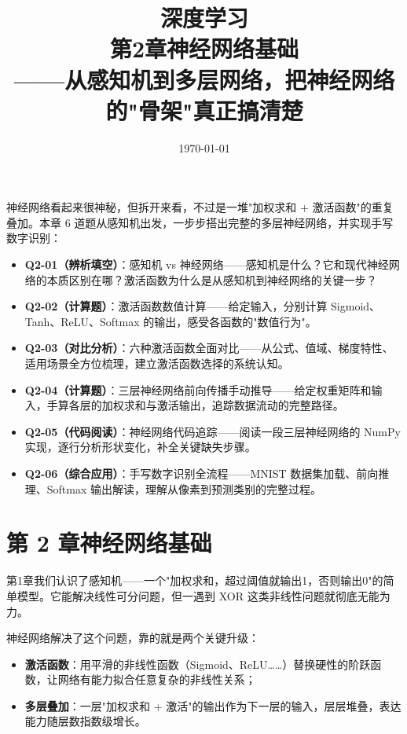 \documentclass[a4paper,11pt]{ctexart}
\title{\textbf{深度学习\\第2章\quad 神经网络基础}\\[0.5em]
{\large\color{gray}——从感知机到多层网络，把神经网络的"骨架"真正搞清楚}}
\date{\today}
\begin{document}
\maketitle

\begin{beginnerbox}
    神经网络看起来很神秘，但拆开来看，不过是一堆"加权求和 + 激活函数"的重复叠加。本章 6 道题从感知机出发，一步步搭出完整的多层神经网络，并实现手写数字识别：

    \begin{itemize}
        \item \textbf{Q2-01（辨析填空）}：感知机 vs 神经网络——感知机是什么？它和现代神经网络的本质区别在哪？激活函数为什么是从感知机到神经网络的关键一步？
        \item \textbf{Q2-02（计算题）}：激活函数数值计算——给定输入，分别计算 Sigmoid、Tanh、ReLU、Softmax 的输出，感受各函数的"数值行为"。
        \item \textbf{Q2-03（对比分析）}：六种激活函数全面对比——从公式、值域、梯度特性、适用场景全方位梳理，建立激活函数选择的系统认知。
        \item \textbf{Q2-04（计算题）}：三层神经网络前向传播手动推导——给定权重矩阵和输入，手算各层的加权求和与激活输出，追踪数据流动的完整路径。
        \item \textbf{Q2-05（代码阅读）}：神经网络代码追踪——阅读一段三层神经网络的 NumPy 实现，逐行分析形状变化，补全关键缺失步骤。
        \item \textbf{Q2-06（综合应用）}：手写数字识别全流程——MNIST 数据集加载、前向推理、Softmax 输出解读，理解从像素到预测类别的完整过程。
    \end{itemize}
\end{beginnerbox}

\section{第 2 章\quad 神经网络基础}

第1章我们认识了感知机——一个"加权求和，超过阈值就输出1，否则输出0"的简单模型。它能解决线性可分问题，但一遇到 XOR 这类非线性问题就彻底无能为力。

神经网络解决了这个问题，靠的就是两个关键升级：

\begin{itemize}
    \item \textbf{激活函数}：用平滑的非线性函数（Sigmoid、ReLU……）替换硬性的阶跃函数，让网络有能力拟合任意复杂的非线性关系；
    \item \textbf{多层叠加}：一层"加权求和 + 激活"的输出作为下一层的输入，层层堆叠，表达能力随层数指数级增长。
\end{itemize}
\end{document}
